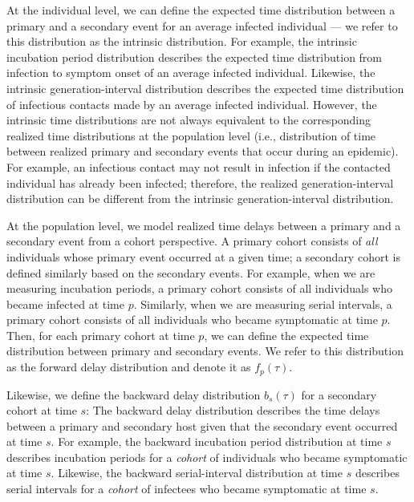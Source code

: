 \documentclass[12pt]{article}
\newcommand{\psymp}{\ensuremath{p}} %
\newcommand{\ssymp}{\ensuremath{s}} %
\begin{document}
At the individual level, we can define the expected time distribution between a primary and a secondary event for an average infected individual --- we refer to this distribution as the intrinsic distribution.
For example, the intrinsic incubation period distribution describes the expected time distribution from infection to symptom onset of an average infected individual.
Likewise, the intrinsic generation-interval distribution describes the expected time distribution of infectious contacts made by an average infected individual.
However, the intrinsic time distributions are not always equivalent to the corresponding realized time distributions at the population level (i.e., distribution of time between realized primary and secondary events that occur during an epidemic).
For example, an infectious contact may not result in infection if the contacted individual has already been infected;
therefore, the realized generation-interval distribution can be different from the intrinsic generation-interval distribution.

At the population level, we model realized time delays between a primary and a secondary event from a cohort perspective.
A primary cohort consists of \emph{all} individuals whose primary event occurred at a given time; 
a secondary cohort is defined similarly based on the secondary events.
For example, when we are measuring incubation periods, a primary cohort consists of all individuals who became infected at time $\psymp$.
Similarly, when we are measuring serial intervals, a primary cohort consists of all individuals who became symptomatic at time $\psymp$.
Then, for each primary cohort at time $\psymp$, we can define the expected time distribution between primary and secondary events.
We refer to this distribution as the forward delay distribution and denote it as $f_\psymp(\tau)$.

Likewise, we define the backward delay distribution $b_\ssymp(\tau)$ for a secondary cohort at time $\ssymp$:
The backward delay distribution describes the time delays between a primary and secondary host given that the secondary event occurred at time $\ssymp$.
For example, the backward incubation period distribution at time $\ssymp$ describes incubation periods for a \emph{cohort} of individuals who became symptomatic at time $\ssymp$.
Likewise, the backward serial-interval distribution at time $\ssymp$ describes serial intervals for a \emph{cohort} of infectees who became symptomatic at time $\ssymp$.
\end{document}
